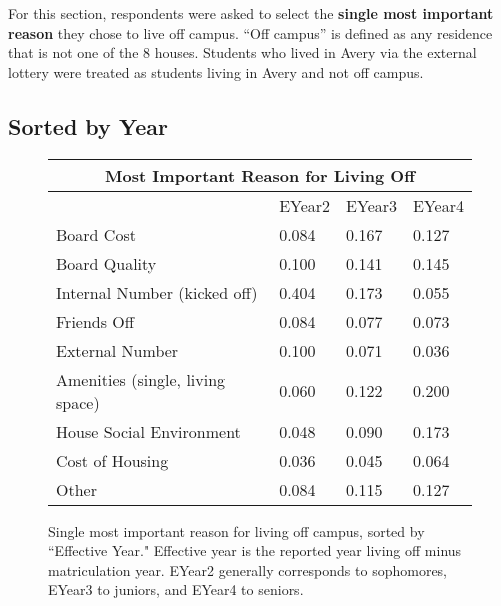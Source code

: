 \documentclass[12pt]{article} %
\begin{document}
For this section, respondents were asked to select the \textbf{single most important reason} they chose to live off campus.
``Off campus'' is defined as any residence that is not one of the 8 houses. Students who lived in Avery via the external lottery were treated as students living in Avery and not off campus. \subsection{Sorted by Year}
\vspace{-5mm}
\begin{figure}[H]

\vspace{-14mm}
\begin{center}
\begin{tabular}{|m{6 cm}|m{1.7 cm}|m{1.7 cm}|m{1.7 cm} |}
\hline
\multicolumn{4}{|c|}{Most Important Reason for Living Off}\\ \hline
& EYear2& EYear3& EYear4\\ \hline
Board Cost   &  0.084 &  0.167 &  0.127\\ \hline
Board Quality   &  0.100 &  0.141 &  0.145\\ \hline
Internal Number (kicked off)   &  0.404 &  0.173 &  0.055\\ \hline
Friends Off   &  0.084 &  0.077 &  0.073\\ \hline
External Number   &  0.100 &  0.071 &  0.036\\ \hline
Amenities (single, living space)   &  0.060 &  0.122 &  0.200\\ \hline
House Social Environment   &  0.048 &  0.090 &  0.173\\ \hline
Cost of Housing   &  0.036 &  0.045 &  0.064\\ \hline
Other   &  0.084 &  0.115 &  0.127\\ \hline
\end{tabular}
\end{center}
\vspace{-5mm}
\caption{Single most important reason for living off campus, sorted by ``Effective Year." Effective year is the reported year living off minus matriculation year. EYear2 generally corresponds to sophomores, EYear3 to juniors, and EYear4 to seniors.}
\end{figure}

\vspace{-20mm}
\end{document}
